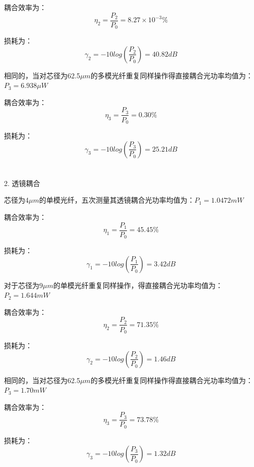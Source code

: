 \documentclass[10pt,a4paper,twoside,UTF8]{ctexart}
\begin{document}
耦合效率为：
\begin{equation*}
	\eta_2=\frac{P_2}{P_0}=8.27\times10^{-3}\%
\end{equation*}

损耗为：
\begin{equation*}
	\gamma_2=-10log\left(\frac{P_2}{P_0}\right)=40.82dB
\end{equation*}

相同的，当对芯径为62.5$\mu m$的多模光纤重复同样操作得直接耦合光功率均值为：$P_3=6.938\mu W$

耦合效率为：
\begin{equation*}
	\eta_3=\frac{P_3}{P_0}=0.30\%
\end{equation*}

损耗为：
\begin{equation*}
	\gamma_3=-10log\left(\frac{P_3}{P_0}\right)=25.21dB
\end{equation*}
\\ \hspace*{\fill} \\

2. 透镜耦合

芯径为4$\mu m$的单模光纤，五次测量其透镜耦合光功率均值为：$P_1=1.0472 m W$

耦合效率为：
\begin{equation*}
	\eta_1=\frac{P_1}{P_0}=45.45\%
\end{equation*}

损耗为：
\begin{equation*}
	\gamma_1=-10log\left(\frac{P_1}{P_0}\right)=3.42dB
\end{equation*}

对于芯径为9$\mu m$的单模光纤重复同样操作，得直接耦合光功率均值为：$P_2=1.644m W$

耦合效率为：
\begin{equation*}
	\eta_2=\frac{P_2}{P_0}=71.35\%
\end{equation*}

损耗为：
\begin{equation*}
	\gamma_2=-10log\left(\frac{P_2}{P_0}\right)=1.46dB
\end{equation*}

相同的，当对芯径为62.5$\mu m$的多模光纤重复同样操作得直接耦合光功率均值为：$P_3=1.70 mW$

耦合效率为：
\begin{equation*}
	\eta_3=\frac{P_3}{P_0}=73.78\%
\end{equation*}

损耗为：
\begin{equation*}
	\gamma_3=-10log\left(\frac{P_3}{P_0}\right)=1.32dB
\end{equation*}
\\ \hspace*{\fill} \\
\end{document}
